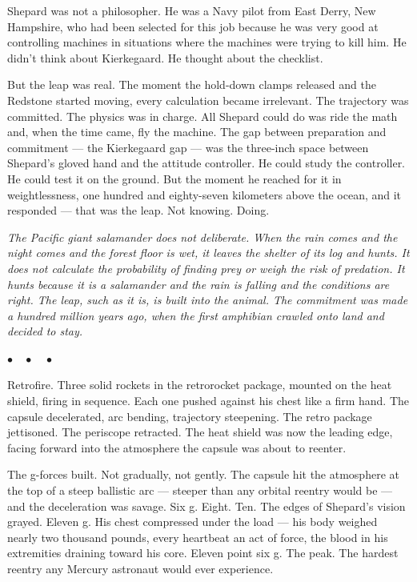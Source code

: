 \documentclass[12pt, letterpaper]{article}
\begin{document}
Shepard was not a philosopher. He was a Navy pilot from East Derry, New Hampshire, who had been selected for this job because he was very good at controlling machines in situations where the machines were trying to kill him. He didn't think about Kierkegaard. He thought about the checklist.

But the leap was real. The moment the hold-down clamps released and the Redstone started moving, every calculation became irrelevant. The trajectory was committed. The physics was in charge. All Shepard could do was ride the math and, when the time came, fly the machine. The gap between preparation and commitment --- the Kierkegaard gap --- was the three-inch space between Shepard's gloved hand and the attitude controller. He could study the controller. He could test it on the ground. But the moment he reached for it in weightlessness, one hundred and eighty-seven kilometers above the ocean, and it responded --- that was the leap. Not knowing. Doing.

\emph{The Pacific giant salamander does not deliberate. When the rain comes and the night comes and the forest floor is wet, it leaves the shelter of its log and hunts. It does not calculate the probability of finding prey or weigh the risk of predation. It hunts because it is a salamander and the rain is falling and the conditions are right. The leap, such as it is, is built into the animal. The commitment was made a hundred million years ago, when the first amphibian crawled onto land and decided to stay.}

\begin{center}
$\bullet\quad\bullet\quad\bullet$
\end{center}

Retrofire. Three solid rockets in the retrorocket package, mounted on the heat shield, firing in sequence. Each one pushed against his chest like a firm hand. The capsule decelerated, arc bending, trajectory steepening. The retro package jettisoned. The periscope retracted. The heat shield was now the leading edge, facing forward into the atmosphere the capsule was about to reenter.

The g-forces built. Not gradually, not gently. The capsule hit the atmosphere at the top of a steep ballistic arc --- steeper than any orbital reentry would be --- and the deceleration was savage. Six g. Eight. Ten. The edges of Shepard's vision grayed. Eleven g. His chest compressed under the load --- his body weighed nearly two thousand pounds, every heartbeat an act of force, the blood in his extremities draining toward his core. Eleven point six g. The peak. The hardest reentry any Mercury astronaut would ever experience.
\end{document}
